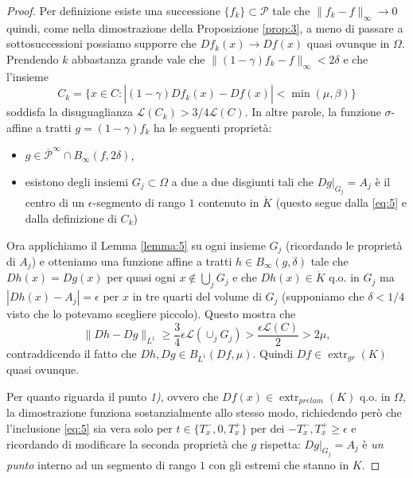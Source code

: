 \documentclass[a4paper,11pt]{book}
\theoremstyle{plain}
\theoremstyle{definition}
\theoremstyle{remark}
\newcommand{\LL}{\mathscr{L}}
\newcommand{\norm}[1]{\lVert#1\rVert}
\DeclareMathOperator{\extr}{extr}
\begin{document}
\begin{proof}
	Per definizione esiste una successione $\{f_{k}\}\subset \mathscr{P}$ tale che $\norm{f_{k}-f}_{\infty}\to 0$ quindi, come nella dimostrazione della Proposizione \ref{prop:3}, a meno di passare a sottosuccessioni possiamo supporre che $Df_{k}(x)\to Df(x)$ quasi ovunque in $\Omega$. Prendendo $k$ abbastanza grande vale che $\norm{(1-\gamma)f_{k}-f}_{\infty}<2\delta$ e che l'insieme
	\[
		C_{k}=\{x\in C : |(1-\gamma)Df_{k}(x)-D\hat{f}(x)|<\min(\mu,\beta)\}
	\]
	soddisfa la disuguaglianza $\LL(C_{k})>3/4\LL(C)$. In altre parole, la funzione $\sigma$-affine a tratti $g=(1-\gamma)f_{k}$ ha le seguenti proprietà:
	\begin{itemize}
		\item $g\in \overline{\mathscr{P}}^{\infty}\cap B_{\infty}(f,2\delta)$,
		\item esistono degli insiemi $G_{j}\subset \Omega$ a due a due disgiunti tali che $Dg|_{G_{j}}=A_{j}$ è il centro di un $\epsilon$-segmento di rango $1$ contenuto in $\mathring{K}$ (questo segue dalla \eqref{eq:5} e dalla definizione di $C_{k}$)%
	\end{itemize}
	Ora applichiamo il Lemma \ref{lemma:5} su ogni insieme $G_{j}$ (ricordando le proprietà di $A_{j}$) e otteniamo una funzione affine a tratti $h\in B_{\infty}(g,\delta)$ tale che $Dh(x)=Dg(x)$ per quasi ogni $x\not\in\bigcup_{j}G_{j}$ e che $Dh(x)\in\mathring{K}$ q.o. in $G_{j}$ ma $|Dh(x)-A_{j}|=\epsilon$ per $x$ in tre quarti del volume di $G_{j}$ (supponiamo che $\delta<1/4$ visto che lo potevamo scegliere piccolo). Questo mostra che
	\[
		\norm{Dh-Dg}_{L^{1}}\geq \frac{3}{4}\epsilon\LL(\cup_{j}G_{j})>\frac{\epsilon\LL(C)}{2}>2\mu,
	\]
	contraddicendo il fatto che $Dh,Dg\in B_{L^{1}}(Df,\mu)$. Quindi $Df\in\extr_{gr}(K)$ quasi ovunque.

	Per quanto riguarda il punto \textit{1)}, ovvero che $Df(x)\in\extr_{prelam}(K)$ q.o. in $\Omega$, la dimostrazione funziona sostanzialmente allo stesso modo, richiedendo però che l'inclusione \eqref{eq:5} sia vera solo per $t\in \{T_{x}^{-},0,T_{x}^{+}\}$
	per dei $-T_{x}^{-},T_{x}^{+}\geq \epsilon$ e ricordando di modificare la seconda proprietà che $g$ rispetta: $Dg|_{G_{j}}=A_{j}$ è \textit{un punto} interno ad un segmento di rango $1$ con gli estremi che stanno in $K$.
	

\end{proof}
\end{document}
